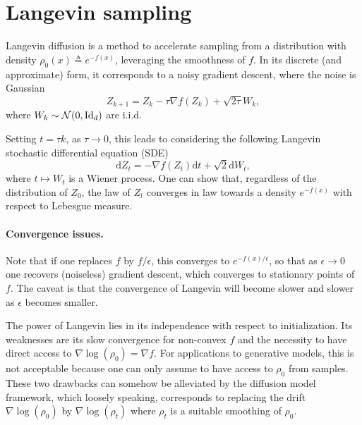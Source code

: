 
\section{Langevin sampling}


Langevin diffusion is a method to accelerate sampling from a distribution with density $\rho_0(x) \triangleq e^{-f(x)}$, leveraging the smoothness of $f$. 
%
In its discrete (and approximate) form, it corresponds to a noisy gradient descent, where the noise is Gaussian
\begin{equation*}
	Z_{k+1} = Z_k - \tau \nabla f(Z_k) + \sqrt{2 \tau} W_k,
\end{equation*}
where $W_k \sim \mathcal{N}(0,\mathrm{Id}_d)$ are i.i.d.

Setting $t = \tau k$, as $\tau \rightarrow 0$, this leads to considering the following Langevin stochastic differential equation (SDE)
\begin{equation}\label{eq:langevin-continuous}
	\mathrm{d} Z_t = -\nabla f(Z_t) \mathrm{d} t + \sqrt{2} \mathrm{d} W_t, 
\end{equation}
where $t \mapsto W_t$ is a Wiener process.
%
One can show that, regardless of the distribution of $Z_0$, the law of $Z_t$ converges in law towards a density $e^{-f(x)}$ with respect to Lebesgue measure.

\paragraph{Convergence issues.} 

Note that if one replaces $f$ by $f/\epsilon$, this converges to $e^{-f(x)/\epsilon}$, so that as $\epsilon \rightarrow 0$ one recovers (noiseless) gradient descent, which converges to stationary points of $f$. The caveat is that the convergence of Langevin will become slower and slower as $\epsilon$ becomes smaller. 

The power of Langevin lies in its independence with respect to initialization. Its weaknesses are its slow convergence for non-convex $f$ and the necessity to have direct access to $\nabla \log(\rho_0) = \nabla f$. For applications to generative models, this is not acceptable because one can only assume to have access to $\rho_0$ from samples. These two drawbacks can somehow be alleviated by the diffusion model framework, which loosely speaking, corresponds to replacing the drift $\nabla \log(\rho_0)$ by $\nabla \log(\rho_{t})$ where $\rho_t$ is a suitable smoothing of $\rho_0$. 

